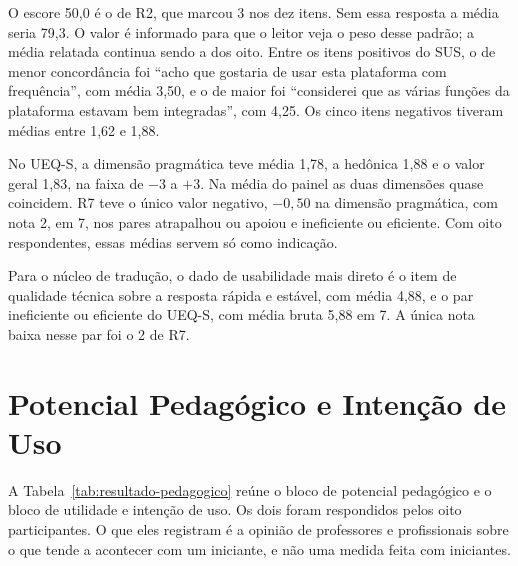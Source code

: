 O escore 50,0 é o de R2, que marcou 3 nos dez itens. Sem essa resposta a média seria 79,3. O valor é informado para que o leitor veja o peso desse padrão; a média relatada continua sendo a dos oito. Entre os itens positivos do SUS, o de menor concordância foi ``acho que gostaria de usar esta plataforma com frequência'', com média 3,50, e o de maior foi ``considerei que as várias funções da plataforma estavam bem integradas'', com 4,25. Os cinco itens negativos tiveram médias entre 1,62 e 1,88.

No UEQ-S, a dimensão pragmática teve média 1,78, a hedônica 1,88 e o valor geral 1,83, na faixa de $-3$ a $+3$. Na média do painel as duas dimensões quase coincidem. R7 teve o único valor negativo, $-0,50$ na dimensão pragmática, com nota 2, em 7, nos pares atrapalhou ou apoiou e ineficiente ou eficiente. Com oito respondentes, essas médias servem só como indicação.

Para o núcleo de tradução, o dado de usabilidade mais direto é o item de qualidade técnica sobre a resposta rápida e estável, com média 4,88, e o par ineficiente ou eficiente do UEQ-S, com média bruta 5,88 em 7. A única nota baixa nesse par foi o 2 de R7.

\section{Potencial Pedagógico e Intenção de Uso}
\label{sec:resultado-pedagogico}

A Tabela~\ref{tab:resultado-pedagogico} reúne o bloco de potencial pedagógico e o bloco de utilidade e intenção de uso. Os dois foram respondidos pelos oito participantes. O que eles registram é a opinião de professores e profissionais sobre o que tende a acontecer com um iniciante, e não uma medida feita com iniciantes.

